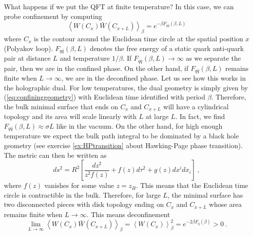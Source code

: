\documentclass{ws-rv9x6}
\newcommand\be{\begin{equation}}
\newcommand\ee{\end{equation}}
\begin{document}
What happens if we put the QFT at finite temperature? In this case,
we can probe confinement by computing 
\be
\left\langle W(C_{x})\bar{W}(C_{x+L})\right\rangle _{\beta}=e^{-\beta F_{q\bar{q}}(\beta,L)}
\ee
where $C_{x}$ is the contour around the Euclidean time circle at the
spatial position $x$ (Polyakov loop). $F_{q\bar{q}}(\beta,L)$ denotes
the free energy of a static quark anti-quark pair at distance $L$
and temperature $1/\beta$. If $F_{q\bar{q}}(\beta,L)\to\infty$ as
we separate the pair, then we are in the confined phase. On the other
hand, if $F_{q\bar{q}}(\beta,L)$ remains finite when $L\to\infty$,
we are in the deconfined phase. Let us see how this works in the holographic
dual. For low temperatures, the dual geometry is simply given by (\ref{eq:confininggeometry})
with Euclidean time identified with period $\beta.$ Therefore, the
bulk minimal surface that ends on $C_{x}$ and $C_{x+L}$ will have
a cylindrical topology and its area will scale linearly with $L$
at large $L$. In fact, we find $F_{q\bar{q}}(\beta,L)\approx\sigma L$
like in the vacuum. On the other hand, for high enough temperature
we expect the bulk path integral to be dominated by a black hole geometry
(see exercise \ref{ex:HPtransition} about Hawking-Page phase transition). The metric can
then be written as 
\begin{equation}
ds^{2}=R^{2}\left[\frac{dz^{2}}{z^{2}f(z)}+f(z)d\tau^{2}+g(z)dx^{i}dx_{i}\right]\ ,\label{eq:confininggeometry-1}
\end{equation}
where $f(z)$ vanishes for some value $z=z_{H}$. This means that
the Euclidean time circle is contractible in the bulk. Therefore,
for large $L$, the minimal surface has two disconnected pieces with
disk topology ending on $C_{x}$ and $C_{x+L}$ whose area remains
finite when $L\to\infty$. This means deconfinement
\be
\lim_{L\to\infty}\left\langle W(C_{x})\bar{W}(C_{x+L})\right\rangle _{\beta}=\left\langle W(C_{x})\right\rangle _{\beta}^{2}=e^{-2\beta F_{q}(\beta)}>0\ .
\ee
\end{document}
